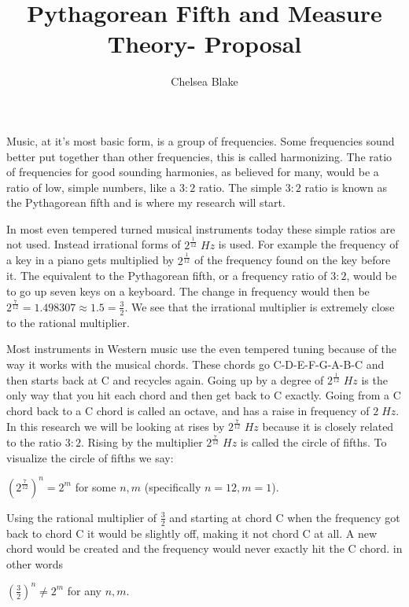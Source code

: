 \documentclass[ebook,12pt,oneside,openany]{memoir}
\title{Pythagorean Fifth and Measure Theory- Proposal}
\author{Chelsea Blake}
\begin{document}
\maketitle

Music, at it's most basic form, is a group of frequencies. Some frequencies sound better put together than other frequencies, this is called harmonizing. The ratio of frequencies for good sounding harmonies, as believed for many, would be a ratio of low, simple numbers, like a $3:2$ ratio. The simple $3:2$ ratio is known as the Pythagorean fifth and is where my research will start.

In most even tempered turned musical instruments today these simple ratios are not used. Instead irrational forms of $2^{\frac{1}{12}} \; Hz$ is used. For example the frequency of a key in a piano gets multiplied by $2^{\frac{1}{12}}$ of the frequency found on the key before it. The equivalent to the Pythagorean fifth, or a frequency ratio of $3 : 2$, would be to go up seven keys on a keyboard. The change in frequency would then be $2^{\frac{7}{12}}=1.498307 \approx 1.5= \frac{3}{2}$. We see that the irrational multiplier is extremely close to the rational multiplier.

Most instruments in Western music use the even tempered tuning because of the way it works with the musical chords. These chords go C-D-E-F-G-A-B-C and then starts back at C and recycles again. Going up by a degree of $2^{\frac{1}{12}} \; Hz$ is the only way that you hit each chord and then get back to C exactly.  Going from a C chord back to a C chord is called an octave, and has a raise in frequency of $2 \; Hz$. In this research we will be looking at rises by $2^{\frac{7}{12}} \; Hz$ because it is closely related to the ratio $3:2$. Rising by the multiplier $2^{\frac{7}{12}} \; Hz$ is called the circle of fifths. To visualize the circle of fifths we say:
\begin{center}
$(2^{\frac{7}{12}})^n=2^m$ for some $n,m$ (specifically $n=12, m=1$).

\end{center}


Using the rational multiplier of $\frac{3}{2}$  and starting at chord C when the frequency got back to chord C it would be slightly off, making it not chord C at all. A new chord would be created and the frequency would never exactly hit the C chord. in other words 
\begin{center}
$(\frac{3}{2})^n \ne 2^m$ for any $n,m$. 
\end{center}
\end{document}
